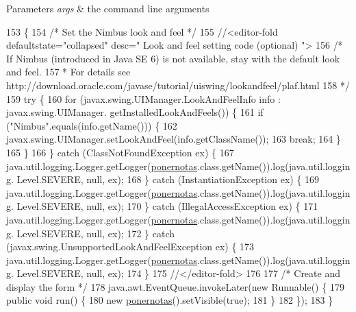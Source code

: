 \begin{DoxyParams}{Parameters}
{\em args} & the command line arguments \\
\hline
\end{DoxyParams}

\begin{DoxyCode}
153                                            \{
154         \textcolor{comment}{/* Set the Nimbus look and feel */}
155         \textcolor{comment}{//<editor-fold defaultstate="collapsed" desc=" Look and feel setting code (optional) ">}
156         \textcolor{comment}{/* If Nimbus (introduced in Java SE 6) is not available, stay with the default look and feel.}
157 \textcolor{comment}{         * For details see http://download.oracle.com/javase/tutorial/uiswing/lookandfeel/plaf.html }
158 \textcolor{comment}{         */}
159         \textcolor{keywordflow}{try} \{
160             \textcolor{keywordflow}{for} (javax.swing.UIManager.LookAndFeelInfo info : javax.swing.UIManager.
      getInstalledLookAndFeels()) \{
161                 \textcolor{keywordflow}{if} (\textcolor{stringliteral}{"Nimbus"}.equals(info.getName())) \{
162                     javax.swing.UIManager.setLookAndFeel(info.getClassName());
163                     \textcolor{keywordflow}{break};
164                 \}
165             \}
166         \} \textcolor{keywordflow}{catch} (ClassNotFoundException ex) \{
167             java.util.logging.Logger.getLogger(\mbox{\hyperlink{classsoftware_1_1ponernotas_a414e3fc6867bed1d7b001e2299c18bbf}{ponernotas}}.class.getName()).log(java.util.logging.
      Level.SEVERE, null, ex);
168         \} \textcolor{keywordflow}{catch} (InstantiationException ex) \{
169             java.util.logging.Logger.getLogger(\mbox{\hyperlink{classsoftware_1_1ponernotas_a414e3fc6867bed1d7b001e2299c18bbf}{ponernotas}}.class.getName()).log(java.util.logging.
      Level.SEVERE, null, ex);
170         \} \textcolor{keywordflow}{catch} (IllegalAccessException ex) \{
171             java.util.logging.Logger.getLogger(\mbox{\hyperlink{classsoftware_1_1ponernotas_a414e3fc6867bed1d7b001e2299c18bbf}{ponernotas}}.class.getName()).log(java.util.logging.
      Level.SEVERE, null, ex);
172         \} \textcolor{keywordflow}{catch} (javax.swing.UnsupportedLookAndFeelException ex) \{
173             java.util.logging.Logger.getLogger(\mbox{\hyperlink{classsoftware_1_1ponernotas_a414e3fc6867bed1d7b001e2299c18bbf}{ponernotas}}.class.getName()).log(java.util.logging.
      Level.SEVERE, null, ex);
174         \}
175         \textcolor{comment}{//</editor-fold>}
176 
177         \textcolor{comment}{/* Create and display the form */}
178         java.awt.EventQueue.invokeLater(\textcolor{keyword}{new} Runnable() \{
179             \textcolor{keyword}{public} \textcolor{keywordtype}{void} run() \{
180                 \textcolor{keyword}{new} \mbox{\hyperlink{classsoftware_1_1ponernotas_a414e3fc6867bed1d7b001e2299c18bbf}{ponernotas}}().setVisible(\textcolor{keyword}{true});
181             \}
182         \});
183     \}
\end{DoxyCode}


